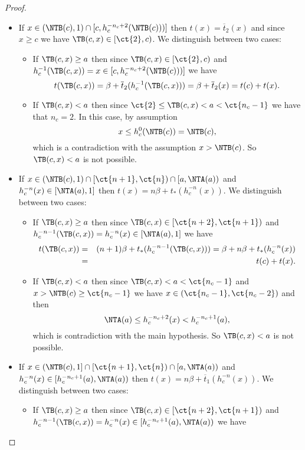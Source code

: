 \begin{proof}
\begin{enumerate}[label=(\roman*)]
\begin{itemize}
\begin{itemize}
\begin{itemize}
				\end{itemize}
				\item If $x \in (\NTB(c),1) \cap [c,h_c^{-n_c+2}(\NTB(c)))]$ then $t(x)= \overline{t}_2(x)$ and  since $x \geq c$ we have $\TB(c,x) \in [\ct{2},c)$. We distinguish between two cases:
				\begin{itemize}
					\item If $\TB(c,x)\geq a$ then since $\TB(c,x) \in [\ct{2},c)$ and $h_c^{-1}(\TB(c,x)) = x \in [c,h_c^{-n_c+2}(\NTB(c)))]$ we have
					$$
					t(\TB(c,x)) = \beta + \overline{t}_2(h_c^{-1}(\TB(c,x))) = \beta + \overline{t}_2(x)=t(c)+t(x).
					$$
					\item If $\TB(c,x) <a$ then since $\ct{2}\leq\TB(c,x)< a<\ct{n_c-1}$ we have that $n_c=2$. In this case, by assumption
					$$x \leq h_c^{0}(\NTB(c)) = \NTB(c),$$
					which is a contradiction with the assumption $x > \NTB(c)$. So $\TB(c,x)<a$ is not possible.
				\end{itemize}
				\item If $x \in (\NTB(c),1) \cap [\ct{n+1},\ct{n}) \cap [a,\NTA(a))$ and $h_c^{-n}(x) \in [\NTA(a),1]$ then $t(x) = n\beta + t_*(h_c^{-n}(x))$. We distinguish between two cases:
				\begin{itemize}
					\item If $\TB(c,x) \geq a$ then since $\TB(c,x) \in [\ct{n+2},\ct{n+1})$ and $h_c^{-n-1}(\TB(c,x)) = h_c^{-n}(x) \in [\NTA(a),1]$ we have
					\begin{eqnarray*}
					t(\TB(c,x)) & = & (n+1)\beta + t_*(h_c^{-n-1}(\TB(c,x))) = \beta + n\beta + t_*(h_c^{-n}(x))\\
					& = & t(c)+t(x).
					\end{eqnarray*}
					\item If $\TB(c,x) < a$ then since $\TB(c,x) < a < \ct{n_c-1}$ and $x > \NTB(c) \geq \ct{n_c-1}$ we have $x \in (\ct{n_c-1},\ct{n_c-2})$  and then
					$$\NTA(a) \leq h_c^{-n_c+2}(x) < h_c^{-n_c+1}(a),$$
					which is contradiction with the main hypothesis.  So $\TB(c,x)<a$ is not possible.
				\end{itemize}
				\item If $x \in (\NTB(c),1] \cap [\ct{n+1},\ct{n}) \cap [a,\NTA(a))$ and $h_c^{-n}(x) \in [h_c^{-n_c+1}(a),\NTA(a))$ then $t(x)=n\beta + \overline{t}_1(h_c^{-n}(x)).$ We distinguish between two cases:
				\begin{itemize}
					\item If $\TB(c,x) \geq a$ then since $\TB(c,x) \in [\ct{n+2},\ct{n+1})$ and $h_c^{-n-1}(\TB(c,x)) = h_c^{-n}(x) \in [h_c^{-n_c+1}(a),\NTA(a))$ we have

\end{itemize}
\end{itemize}
\end{itemize}
\end{enumerate}
\end{proof}
